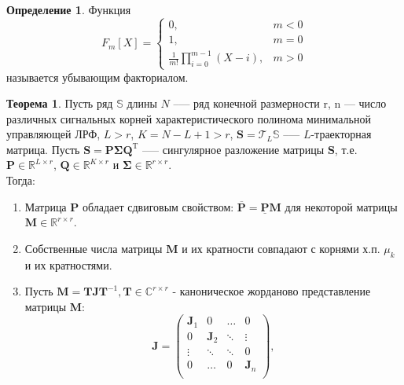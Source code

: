 \documentclass[specialist, substylefile = spbureport.rtx, subf,href,colorlinks=true, 12pt]{disser}
\theoremstyle{definition}
\newtheorem{definition}{Определение}
\newtheorem{theorem}{Теорема}
\begin{document}
\begin{definition}
        Функция
        \begin{equation*}
            F_m[X] = \begin{cases}
            0, & m < 0 \\
            1, & m = 0 \\
            \frac{1}{m!}\prod_{i=0}^{m - 1}(X - i), & m>0
            \end{cases}
        \end{equation*}
        называется убывающим факториалом.
    \end{definition}

\begin{theorem}
\label{th4}
Пусть ряд $\mathbb{S}$ длины $N$ --— ряд конечной размерности r, n --- число различных сигнальных корней характеристического полинома минимальной управляющей ЛРФ, $L > r$, $K = N - L + 1 > r$, $\mathbf{S} = \mathcal{T}_L\mathbb{S}$ --— $L$-траекторная матрица. Пусть $\mathbf{S} = \mathbf{P\Sigma Q}^{\mathrm{T}}$ --— сингулярное разложение матрицы $\mathbf{S}$, т.е. $\mathbf{P} \in \mathbb{R}^{L \times r}$, $\mathbf{Q} \in \mathbb{R}^{K \times r}$ и $\mathbf{\Sigma} \in \mathbb{R}^{r \times r}$. \\
    \hspace*{0.5cm} Тогда:
    \begin{enumerate}
        \item Матрица $\mathbf{P}$ обладает сдвиговым свойством: $\overline{\mathbf{P}} = \underline{\mathbf{P}}\mathbf{M}$ для некоторой матрицы $\mathbf{M} \in \mathbb{R}^{r \times r}$.
        \item Собственные числа матрицы $\mathbf{M}$ и их кратности совпадают с корнями х.п. $\mu_k$ и их кратностями.
        \item Пусть $\mathbf{M} = \mathbf{TJ}\mathbf{T}^{-1}, \mathbf{T} \in \mathbb{C}^{r \times r}$ - каноническое жорданово представление матрицы $\mathbf{M}$:
        \begin{equation*}
            \mathbf{J} = \begin{pmatrix}
                    \mathbf{J}_1 & 0 & \ldots & 0\\
                    0 & \mathbf{J}_2 & \ddots & \vdots \\
                    \vdots & \ddots & \ddots & 0 \\
                    0 & \ldots & 0 & \mathbf{J}_n \\
                    \end{pmatrix},

\end{equation*}
\end{enumerate}
\end{theorem}
\end{document}
